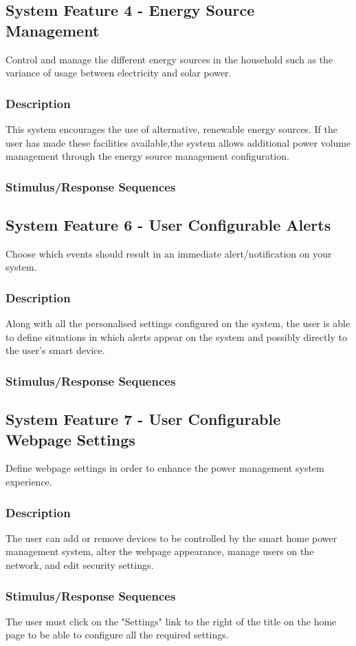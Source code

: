 \documentclass[11pt, a4paper]{article}
\begin{document}
	\subsection{System Feature 4 - Energy Source Management}
	Control and manage the different energy sources in the household such as the variance of usage between electricity and solar power. 
	\subsubsection{Description}
	This system encourages the use of alternative, renewable energy sources. If the user has made these facilities available,the system allows additional power volume management through the energy source management configuration. 
	\subsubsection{Stimulus/Response Sequences}
	\subsection{System Feature 6 - User Configurable Alerts} 
	Choose which events should result in an immediate alert/notification on your system. 
	\subsubsection{Description}
	Along with all the personalised settings configured on the system, the user is able to define situations in which alerts appear on the system and possibly directly to the user's smart device. 
	\subsubsection{Stimulus/Response Sequences}
	\subsection{System Feature 7 - User Configurable Webpage Settings} 
	Define webpage settings in order to enhance the power management system experience.
	\subsubsection{Description}
	The user can add or remove devices to be controlled by the smart home power management system, alter the webpage appearance, manage users on the network, and edit security settings. 
	\subsubsection{Stimulus/Response Sequences}
	The user must click on the "Settings" link to the right of the title on the home page to be able to configure all the required settings.
	
\end{document}
